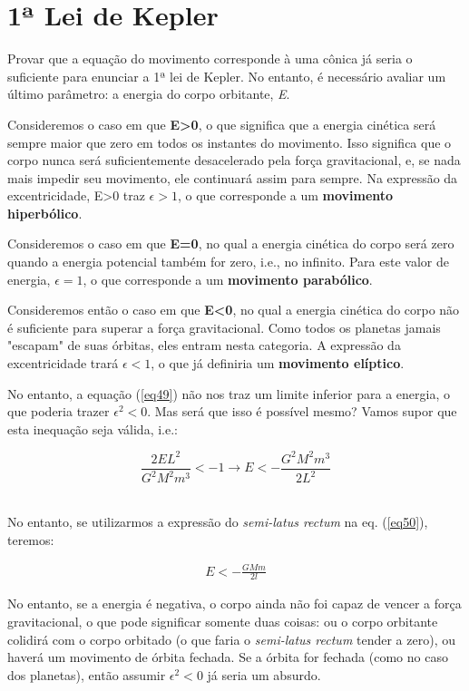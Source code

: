 \section{1ª Lei de Kepler}

Provar que a equação do movimento corresponde à uma cônica já seria o suficiente para enunciar a 1ª lei de Kepler. No entanto, é necessário avaliar um último parâmetro: a energia do corpo orbitante, \textit{E}.{\\}

Consideremos o caso em que \textbf{E>0}, o que significa que a energia cinética será sempre maior que zero em todos os instantes do movimento. Isso significa que o corpo nunca será suficientemente desacelerado pela força gravitacional, e, se nada mais impedir seu movimento, ele continuará assim para sempre. Na expressão da excentricidade, E>0 traz $\epsilon>1$, o que corresponde a um \textbf{movimento hiperbólico}. {\\}

Consideremos o caso em que \textbf{E=0}, no qual a energia cinética do corpo será zero quando a energia potencial também for zero, i.e., no infinito. Para este valor de energia, $\epsilon=1$, o que corresponde a um \textbf{movimento parabólico}. {\\}

Consideremos então o caso em que \textbf{E<0}, no qual a energia cinética do corpo não é suficiente para superar a força gravitacional. Como todos os planetas jamais "escapam" de suas órbitas, eles entram nesta categoria. A expressão da excentricidade trará $\epsilon<1$, o que já definiria um \textbf{movimento elíptico}.{\\}

No entanto, a equação (\ref{eq49}) não nos traz um limite inferior para a energia, o que poderia trazer $\epsilon^2<0$. Mas será que isso é possível mesmo? Vamos supor que esta inequação seja válida, i.e.:

\[
	\frac{2EL^2}{G^2M^2m^3}<-1 \rightarrow E<-\frac{G^2M^2m^3}{2L^2}
\]{\\}

No entanto, se utilizarmos a expressão do \textit{semi-latus rectum} na eq. (\ref{eq50}), teremos:

\begin{eqnarray}
	E<-\frac{GMm}{2l}		\label{eq51}
\end{eqnarray}

No entanto, se a energia é negativa, o corpo ainda não foi capaz de vencer a força gravitacional, o que pode significar somente duas coisas: ou o corpo orbitante colidirá com o corpo orbitado (o que faria o \textit{semi-latus rectum} tender a zero), ou haverá um movimento de órbita fechada. Se a órbita for fechada (como no caso dos planetas), então assumir $\epsilon^2<0$ já seria um absurdo. {\\}

